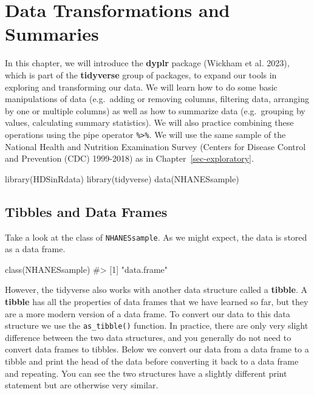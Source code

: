 \documentclass[
  letterpaper,
]{krantz}
\makeatletter
\newenvironment{Shaded}{\begin{snugshade}}{\end{snugshade}}
\newcommand{\CommentTok}[1]{\textcolor[rgb]{0.37,0.37,0.37}{#1}}
\newcommand{\FunctionTok}[1]{\textcolor[rgb]{0.28,0.35,0.67}{#1}}
\newcommand{\NormalTok}[1]{\textcolor[rgb]{0.00,0.23,0.31}{#1}}
\newenvironment{kframe}{%
\medskip{}
\setlength{\fboxsep}{.8em}
 \def\at@end@of@kframe{}%
 \ifinner\ifhmode%
  \def\at@end@of@kframe{\end{minipage}}%
  \begin{minipage}{\columnwidth}%
 \fi\fi%
 \def\FrameCommand##1{\hskip\@totalleftmargin \hskip-\fboxsep
 \colorbox{shadecolor}{##1}\hskip-\fboxsep
     \hskip-\linewidth \hskip-\@totalleftmargin \hskip\columnwidth}%
 \MakeFramed {\advance\hsize-\width
   \@totalleftmargin\z@ \linewidth\hsize
   \@setminipage}}%
 {\par\unskip\endMakeFramed%
 \at@end@of@kframe}
\renewenvironment{Shaded}{\begin{kframe}}{\end{kframe}}
\makeatother
\begin{document}
\chapter{Data Transformations and
Summaries}\label{sec-transformations-summaries}

In this chapter, we will introduce the \textbf{dyplr} package (Wickham
et al. 2023), which is part of the \textbf{tidyverse} group of packages,
to expand our tools in exploring and transforming our data. We will
learn how to do some basic manipulations of data (e.g.~adding or
removing columns, filtering data, arranging by one or multiple columns)
as well as how to summarize data (e.g.~grouping by values, calculating
summary statistics). We will also practice combining these operations
using the pipe operator \texttt{\%\textgreater{}\%}. We will use the
same sample of the National Health and Nutrition Examination Survey
(Centers for Disease Control and Prevention (CDC) 1999-2018) as in
Chapter~\ref{sec-exploratory}.

\begin{Shaded}
\begin{Highlighting}[]
\FunctionTok{library}\NormalTok{(HDSinRdata)}
\FunctionTok{library}\NormalTok{(tidyverse)}
\FunctionTok{data}\NormalTok{(NHANESsample)}
\end{Highlighting}
\end{Shaded}

\section{Tibbles and Data Frames}\label{tibbles-and-data-frames}

Take a look at the class of \texttt{NHANESsample}. As we might expect,
the data is stored as a data frame.

\begin{Shaded}
\begin{Highlighting}[]
\FunctionTok{class}\NormalTok{(NHANESsample)}
\CommentTok{\#\textgreater{} [1] "data.frame"}
\end{Highlighting}
\end{Shaded}

However, the tidyverse also works with another data structure called a
\textbf{tibble}. A \textbf{tibble} has all the properties of data frames
that we have learned so far, but they are a more modern version of a
data frame. To convert our data to this data structure we use the
\texttt{as\_tibble()} function. In practice, there are only very slight
difference between the two data structures, and you generally do not
need to convert data frames to tibbles. Below we convert our data from a
data frame to a tibble and print the head of the data before converting
it back to a data frame and repeating. You can see the two structures
have a slightly different print statement but are otherwise very
similar.
\end{document}
